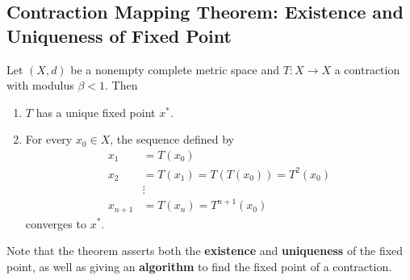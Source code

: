 \documentclass[11pt]{elegantbook}
\begin{document}
\subsection{Contraction Mapping Theorem: Existence and Uniqueness of Fixed Point}
\begin{theorem}
    Let $(X, d)$ be a nonempty complete metric space and $T : X \rightarrow X$ a contraction with modulus $\beta < 1$. Then
    \begin{enumerate}
        \item $T$ has a unique fixed point $x^*$.
        \item For every $x_0 \in X$, the sequence defined by
        \begin{equation}
            \begin{aligned}
                x_1&=T(x_0)\\
                x_2&=T(x_1)=T(T(x_0))=T^2(x_0)\\
                &\vdots\\
                x_{n+1}&=T(x_n)=T^{n+1}(x_0)
            \end{aligned}
            \nonumber
        \end{equation}
        converges to $x^*$.
    \end{enumerate}
\end{theorem}
Note that the theorem asserts both the \textbf{existence} and \textbf{uniqueness} of the fixed point, as well as giving an \textbf{algorithm} to find the fixed point of a contraction.
\end{document}
